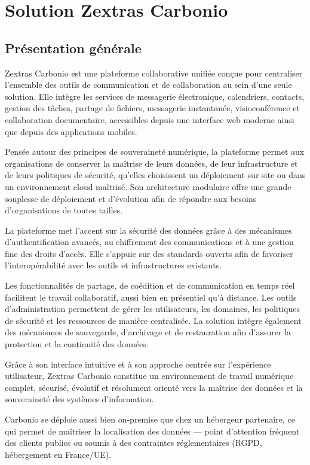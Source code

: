 \documentclass[11pt,a4paper]{report}
\begin{document}
\chapter{Solution Zextras Carbonio}

\section{Présentation générale}
Zextras Carbonio est une plateforme collaborative unifiée conçue pour centraliser l'ensemble des outils de communication et de collaboration au sein d'une seule solution. Elle intègre les services de messagerie électronique, calendriers, contacts, gestion des tâches, partage de fichiers, messagerie instantanée, visioconférence et collaboration documentaire, accessibles depuis une interface web moderne ainsi que depuis des applications mobiles.

Pensée autour des principes de souveraineté numérique, la plateforme permet aux organisations de conserver la maîtrise de leurs données, de leur infrastructure et de leurs politiques de sécurité, qu'elles choisissent un déploiement sur site ou dans un environnement cloud maîtrisé. Son architecture modulaire offre une grande souplesse de déploiement et d'évolution afin de répondre aux besoins d'organisations de toutes tailles.

La plateforme met l'accent sur la sécurité des données grâce à des mécanismes d'authentification avancés, au chiffrement des communications et à une gestion fine des droits d'accès. Elle s'appuie sur des standards ouverts afin de favoriser l'interopérabilité avec les outils et infrastructures existants.

Les fonctionnalités de partage, de coédition et de communication en temps réel facilitent le travail collaboratif, aussi bien en présentiel qu'à distance. Les outils d'administration permettent de gérer les utilisateurs, les domaines, les politiques de sécurité et les ressources de manière centralisée. La solution intègre également des mécanismes de sauvegarde, d'archivage et de restauration afin d'assurer la protection et la continuité des données.

Grâce à son interface intuitive et à son approche centrée sur l'expérience utilisateur, Zextras Carbonio constitue un environnement de travail numérique complet, sécurisé, évolutif et résolument orienté vers la maîtrise des données et la souveraineté des systèmes d'information.

Carbonio se déploie aussi bien on-premise que chez un hébergeur partenaire, ce qui permet de maîtriser la localisation des données --- point d'attention fréquent des clients publics ou soumis à des contraintes réglementaires (RGPD, hébergement en France/UE).
\end{document}

